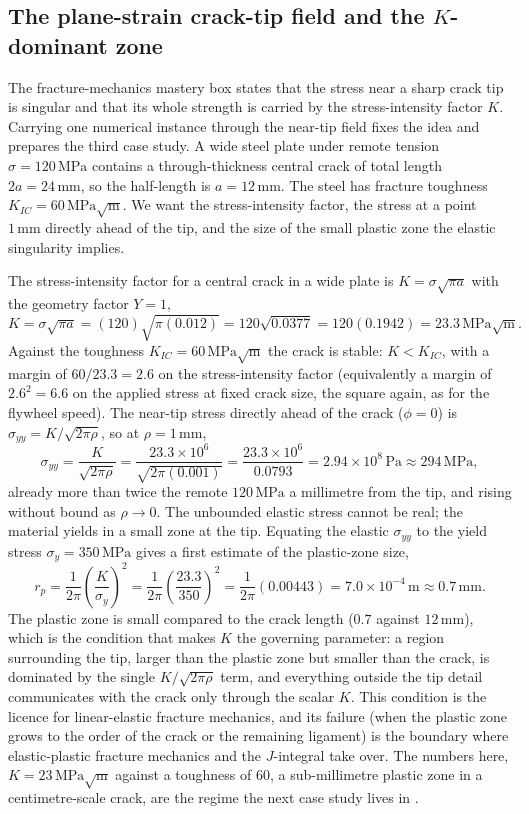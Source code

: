 \subsection{The plane-strain crack-tip field and the $K$-dominant zone}

The fracture-mechanics mastery box states that the stress near a sharp
crack tip is singular and that its whole strength is carried by the
stress-intensity factor $K$. Carrying one numerical instance through the
near-tip field fixes the idea and prepares the third case study. A wide
steel plate under remote tension $\sigma = 120\,\text{MPa}$ contains a
through-thickness central crack of total length $2a = 24\,\si{\milli
\meter}$, so the half-length is $a = 12\,\si{\milli\meter}$. The steel
has fracture toughness $K_{IC} = 60\,\text{MPa}\sqrt{\text{m}}$. We want
the stress-intensity factor, the stress at a point $1\,\si{\milli\meter}$
directly ahead of the tip, and the size of the small plastic zone the
elastic singularity implies.

The stress-intensity factor for a central crack in a wide plate is $K =
\sigma\sqrt{\pi a}$ with the geometry factor $Y = 1$,
\[
K = \sigma\sqrt{\pi a} = (120)\sqrt{\pi(0.012)} = 120\sqrt{0.0377} =
120(0.1942) = 23.3\,\text{MPa}\sqrt{\text{m}}.
\]
Against the toughness $K_{IC} = 60\,\text{MPa}\sqrt{\text{m}}$ the crack
is stable: $K < K_{IC}$, with a margin of $60/23.3 = 2.6$ on the
stress-intensity factor (equivalently a margin of $2.6^2 = 6.6$ on the
applied stress at fixed crack size, the square again, as for the
flywheel speed). The near-tip stress directly ahead of the crack
($\phi = 0$) is $\sigma_{yy} = K/\sqrt{2\pi\rho}$, so at $\rho =
1\,\si{\milli\meter}$,
\[
\sigma_{yy} = \frac{K}{\sqrt{2\pi\rho}} = \frac{23.3\times 10^6}{\sqrt{2
\pi(0.001)}} = \frac{23.3\times 10^6}{0.0793} = 2.94\times 10^8\,\text{
Pa} \approx 294\,\text{MPa},
\]
already more than twice the remote $120\,\text{MPa}$ a millimetre from
the tip, and rising without bound as $\rho \to 0$. The unbounded
elastic stress cannot be real; the material yields in a small zone at
the tip. Equating the elastic $\sigma_{yy}$ to the yield stress $\sigma_y
= 350\,\text{MPa}$ gives a first estimate of the plastic-zone size,
\[
r_p = \frac{1}{2\pi}\left(\frac{K}{\sigma_y}\right)^2 = \frac{1}{2\pi}
\left(\frac{23.3}{350}\right)^2 = \frac{1}{2\pi}(0.00443) = 7.0\times
10^{-4}\,\text{m} \approx 0.7\,\si{\milli\meter}.
\]
The plastic zone is small compared to the crack length ($0.7$ against
$12\,\si{\milli\meter}$), which is the condition that makes $K$ the
governing parameter: a region surrounding the tip, larger than the
plastic zone but smaller than the crack, is dominated by the single
$K\!/\!\sqrt{2\pi\rho}$ term, and everything outside the tip detail
communicates with the crack only through the scalar $K$. This
 condition is the licence for
linear-elastic fracture mechanics, and its failure (when the plastic
zone grows to the order of the crack or the remaining ligament) is the
boundary where elastic-plastic fracture mechanics and the $J$-integral
take over. The numbers here, $K = 23\,\text{MPa}\sqrt{\text{m}}$ against
a toughness of $60$, a sub-millimetre plastic zone in a centimetre-scale
crack, are the regime the next case study lives in
\cite{text:hertzberg-fatigue}.

